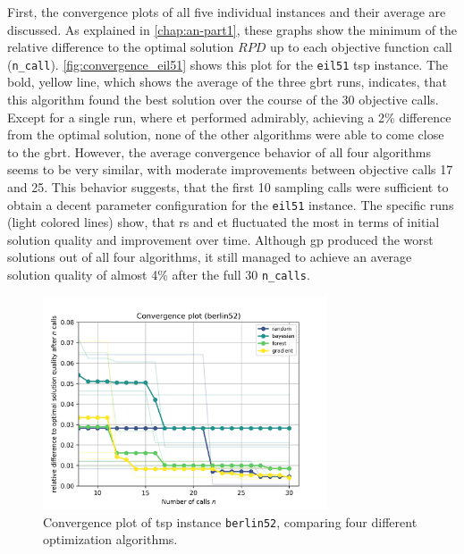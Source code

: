 First, the convergence plots of all five individual instances and their average are discussed. As explained in \cref{chap:an-part1}, these graphs show the minimum of the relative difference to the optimal solution $RPD$ up to each objective function call (\texttt{n\_call}). \cref{fig:convergence_eil51} shows this plot for the \texttt{eil51} \gls{tsp} instance. The bold, yellow line, which shows the average of the three \gls{gbrt} runs, indicates, that this algorithm found the best solution over the course of the 30 objective calls. Except for a single run, where \gls{et} performed admirably, achieving a 2\% difference from the optimal solution, none of the other algorithms were able to come close to the \gls{gbrt}. However, the average convergence behavior of all four algorithms seems to be very similar, with moderate improvements between objective calls 17 and 25. This behavior suggests, that the first 10 sampling calls were sufficient to obtain a decent parameter configuration for the \texttt{eil51} instance. The specific runs (light colored lines) show, that \gls{rs} and \gls{et} fluctuated the most in terms of initial solution quality and improvement over time. Although \gls{gp} produced the worst solutions out of all four algorithms, it still managed to achieve an average solution quality of almost 4\% after the full 30 \texttt{n\_calls}.

\begin{figure}[h]
	\centering
	\includegraphics[width=0.75\textwidth]{results/part1/convergence_berlin52.png}
	\caption[Convergence plot of \gls{tsp} instance \texttt{berlin52}]{Convergence plot of \gls{tsp} instance \texttt{berlin52}, comparing four different optimization algorithms.}
	\label{fig:convergence_berlin52}
\end{figure}

